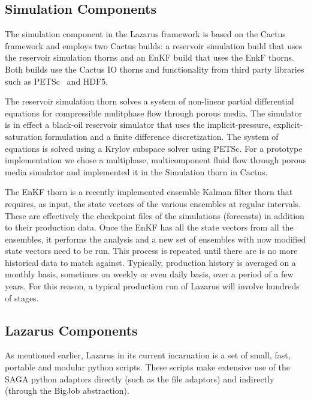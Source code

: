 \documentclass[conference,final]{IEEEtran}
\begin{document}

\subsection{Simulation Components}
The simulation component in the Lazarus framework is based on the Cactus
framework and employs two Cactus builds: a reservoir simulation build
that uses the reservoir simulation thorns and an EnKF build that
uses the EnkF thorns. Both builds use the Cactus IO thorns and functionality
from third party libraries such as PETSc~\cite{PETSc} and HDF5.

The reservoir simulation thorn solves a system of non-linear partial differential
equations for compressible mulitphase flow through porous media. The
simulator is in effect a black-oil reservoir simulator that uses
the implicit-pressure, explicit-saturation formulation and a
finite difference discretization. The system of equations is solved
using a Krylov subspace solver using PETSc. For a prototype
implementation we chose a multiphase, multicomponent fluid flow
through porous media simulator and implemented it in the Simulation
thorn in Cactus.

The EnKF thorn is a recently implemented ensemble Kalman filter
thorn that requires, as input, the state vectors of the various
ensembles at regular intervals. These are effectively the checkpoint
files of the simulations (forecasts) in addition to their production
data. Once the EnKF has all the state vectors from all the ensembles, 
it performs the analysis and a new set of ensembles with now modified
state vectors need to be run. This process is repeated until there
are is no more historical data to match against. Typically,
production history is averaged on a monthly basis, sometimes on weekly
or even daily basis, over a period of a few years. For this reason,
a typical production run of Lazarus will involve hundreds of stages.

\subsection{Lazarus Components}
As mentioned earlier, Lazarus in its current incarnation is a set
of small, fast, portable and modular python scripts. These scripts
make extensive use of the SAGA python adaptors directly (such as the
file adaptors) and indirectly (through the BigJob abstraction).
\end{document}
